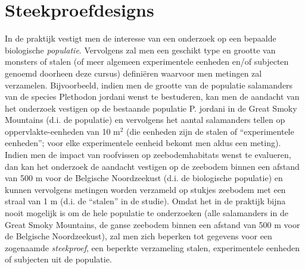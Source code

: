 \documentclass[
  12pt,dutch]{book}
\theoremstyle{definition}
\theoremstyle{definition}
\theoremstyle{definition}
\theoremstyle{definition}
\theoremstyle{remark}
\begin{document}
\section{Steekproefdesigns}\label{sec:steekproefdesigns}

In de praktijk vestigt men de interesse van een onderzoek op een bepaalde biologische \emph{populatie}. Vervolgens zal men een geschikt type en grootte van monsters of stalen (of meer algemeen experimentele eenheden en/of subjecten genoemd doorheen deze cursus) definiëren waarvoor men metingen zal verzamelen. Bijvoorbeeld, indien men de grootte van de populatie salamanders van de species Plethodon jordani wenst te bestuderen, kan men de aandacht van het onderzoek vestigen op de bestaande populatie P. jordani in de Great Smoky Mountains (d.i. de populatie) en vervolgens het aantal salamanders tellen op oppervlakte-eenheden van 10 m\(^2\) (die eenheden zijn de stalen of ``experimentele eenheden''; voor elke experimentele eenheid bekomt men aldus een meting). Indien men de impact van roofvissen op zeebodemhabitats wenst te evalueren, dan kan het onderzoek de aandacht vestigen op de zeebodem binnen een afstand van 500 m voor de Belgische Noordzeekust (d.i. de biologische populatie) en kunnen vervolgens metingen worden verzameld op stukjes zeebodem met een straal van 1 m (d.i. de ``stalen'' in de studie). Omdat het in de praktijk bijna nooit mogelijk is om de hele populatie te onderzoeken (alle salamanders in de Great Smoky Mountains, de ganse zeebodem binnen een afstand van 500 m voor de Belgische Noordzeekust), zal men zich beperken tot gegevens voor een zogenaamde \emph{steekproef}, een beperkte verzameling stalen, experimentele eenheden of subjecten uit de populatie.
\end{document}
